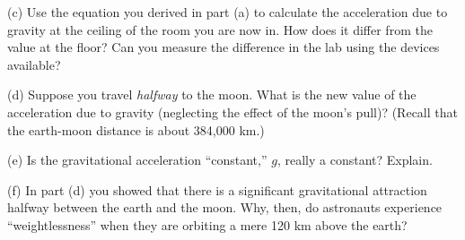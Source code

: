(c) Use the equation you derived in part (a) to calculate the acceleration due
to gravity at the ceiling of the room you are now in. How does it differ from
the value at the floor? Can you measure the difference in the lab using the
devices available?
\vspace{30mm}

(d) Suppose you travel \textit{halfway} to the moon. What is the new value of the acceleration due to gravity (neglecting the effect of the moon's pull)? (Recall that the earth-moon distance is about 384,000 km.)
\vspace{30mm}

(e) Is the gravitational acceleration ``constant,'' $g$, really 
a constant? Explain.
\vspace{30mm}

(f) In part (d) you showed that there is a significant gravitational attraction
halfway between the earth and the moon. Why, then, do astronauts experience
``weightlessness'' when they are orbiting a mere 120 km above the earth?

